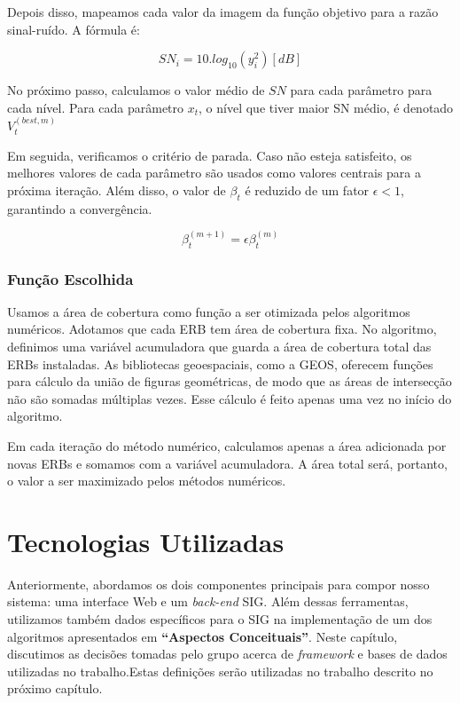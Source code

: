 \documentclass[]{politex}
\newcommand*\NewPage{\newpage\null\thispagestyle{empty}\newpage}
\begin{document}
Depois disso, mapeamos cada valor da imagem da função objetivo para a razão
sinal-ruído. A fórmula é:

\begin{equation}
    SN_i = 10.log_{10}(y_i^2) [dB]
\end{equation}

No próximo passo, calculamos o valor médio de $SN$ para cada parâmetro para cada
nível. Para cada parâmetro $x_t$, o nível que tiver maior SN médio, é denotado
$V_t^{(best, m)}$

Em seguida, verificamos o critério de parada. Caso não esteja satisfeito, os
melhores valores de cada parâmetro são usados como valores centrais para a
próxima iteração. Além disso, o valor de $\beta_t$ é reduzido de um fator
$\epsilon < 1$, garantindo a convergência.

\begin{equation}
    \beta_t^{(m+1)} = \epsilon\beta_t^{(m)}
\end{equation}

\subsection{Função Escolhida}

Usamos a área de cobertura como função a ser otimizada pelos algoritmos
numéricos. Adotamos que cada ERB tem área de cobertura fixa. No algoritmo,
definimos uma variável acumuladora que guarda a área de cobertura total das ERBs
instaladas. As bibliotecas geoespaciais, como a GEOS, oferecem funções para
cálculo da união de figuras geométricas, de modo que as áreas de intersecção não
são somadas múltiplas vezes. Esse cálculo é feito apenas uma vez no início do
algoritmo.

Em cada iteração do método numérico, calculamos apenas a área adicionada por
novas ERBs e somamos com a variável acumuladora. A área total será, portanto, o
valor a ser maximizado pelos métodos numéricos.

\NewPage
\chapter{Tecnologias Utilizadas}

Anteriormente, abordamos os dois componentes principais para compor nosso
sistema: uma interface Web e um \textit{back-end} SIG. Além dessas ferramentas,
utilizamos também dados específicos para o SIG na implementação de um dos
algoritmos apresentados em \textbf{``Aspectos Conceituais''}. Neste capítulo,
discutimos as decisões tomadas pelo grupo acerca de \textit{framework} e bases de
dados utilizadas no trabalho.Estas definições serão utilizadas no trabalho
descrito no próximo capítulo.
\end{document}
